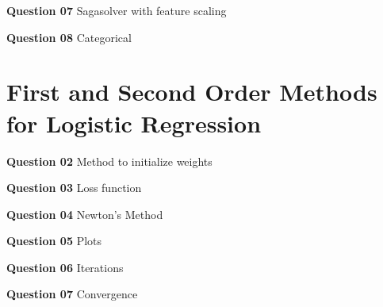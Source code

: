 \documentclass{article}[a4paper]
\begin{document}
	\textbf{Question 07} Sagasolver with feature scaling
	\medskip

	\textbf{Question 08} Categorical
	\medskip

	\section{First and Second Order Methods for Logistic Regression}

	\textbf{Question 02} Method to initialize weights
	\medskip

	\textbf{Question 03} Loss function
	\medskip

	\textbf{Question 04} Newton's Method
	\medskip

	\textbf{Question 05} Plots
	\medskip

	\textbf{Question 06} Iterations
	\medskip

	\textbf{Question 07} Convergence
\end{document}
